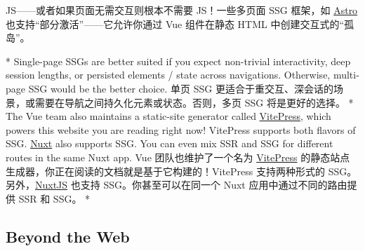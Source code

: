 \begin{paracol}{2}
\begin{itemize}
  JS------或者如果页面无需交互则根本不需要 JS！一些多页面 SSG 框架，如
  \href{https://astro.build/}{Astro}
  也支持``部分激活''------它允许你通过 Vue 组件在静态 HTML
  中创建交互式的``孤岛''。
\end{itemize}
\switchcolumn[0]*%
Single-page SSGs are better suited if you expect non-trivial
interactivity, deep session lengths, or persisted elements / state
across navigations. Otherwise, multi-page SSG would be the better
choice.
\switchcolumn
单页 SSG
更适合于重交互、深会话的场景，或需要在导航之间持久化元素或状态。否则，多页
SSG 将是更好的选择。
\switchcolumn[0]*%
The Vue team also maintains a static-site generator called
\href{https://vitepress.dev/}{VitePress}, which powers this website you
are reading right now! VitePress supports both flavors of SSG.
\href{https://nuxt.com/}{Nuxt} also supports SSG. You can even mix SSR
and SSG for different routes in the same Nuxt app.
\switchcolumn
Vue 团队也维护了一个名为 \href{https://vitepress.dev/}{VitePress}
的静态站点生成器，你正在阅读的文档就是基于它构建的！VitePress
支持两种形式的 SSG。另外，\href{https://nuxt.com/}{NuxtJS} 也支持
SSG。你甚至可以在同一个 Nuxt 应用中通过不同的路由提供 SSR 和 SSG。
\switchcolumn[0]*%
\subsection{Beyond the Web}
\switchcolumn

\end{paracol}
